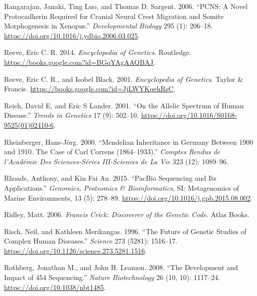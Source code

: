 \documentclass[
]{book}
\newlength{\cslhangindent}
\newlength{\cslentryspacingunit} %
\newenvironment{CSLReferences}[2] %
 {%
  \setlength{\parindent}{0pt}
  \ifodd #1
  \let\oldpar\par
  \def\par{\hangindent=\cslhangindent\oldpar}
  \fi
  \setlength{\parskip}{#2\cslentryspacingunit}
 }%
 {}
\begin{document}
\begin{CSLReferences}{1}{0}
\leavevmode{}%
Rangarajan, Janaki, Ting Luo, and Thomas D. Sargent. 2006. {``{PCNS}: {A} Novel Protocadherin Required for Cranial Neural Crest Migration and Somite Morphogenesis in {Xenopus}.''} \emph{Developmental Biology} 295 (1): 206--18. \url{https://doi.org/10.1016/j.ydbio.2006.03.025}.

\leavevmode{}%
Reeve, Eric C. R. 2014. \emph{Encyclopedia of {Genetics}}. {Routledge}. \url{https://books.google.com?id=BGqYAgAAQBAJ}.

\leavevmode{}%
Reeve, Eric C. R., and Isobel Black. 2001. \emph{Encyclopedia of {Genetics}}. {Taylor \& Francis}. \url{https://books.google.com?id=JjLWYKqehRsC}.

\leavevmode{}%
Reich, David E, and Eric S Lander. 2001. {``On the Allelic Spectrum of Human Disease.''} \emph{Trends in Genetics} 17 (9): 502--10. \url{https://doi.org/10.1016/S0168-9525(01)02410-6}.

\leavevmode{}%
Rheinberger, Hans-Jörg. 2000. {``Mendelian Inheritance in {Germany} Between 1900 and 1910. {The} Case of {Carl Correns} (1864--1933).''} \emph{Comptes Rendus de l'Académie Des Sciences-Séries III-Sciences de La Vie} 323 (12): 1089--96.

\leavevmode{}%
Rhoads, Anthony, and Kin Fai Au. 2015. {``{PacBio Sequencing} and {Its Applications}.''} \emph{Genomics, Proteomics \& Bioinformatics}, {SI}: {Metagenomics} of {Marine Environments}, 13 (5): 278--89. \url{https://doi.org/10.1016/j.gpb.2015.08.002}.

\leavevmode{}%
Ridley, Matt. 2006. \emph{Francis {Crick}: Discoverer of the Genetic Code}. {Atlas Books}.

\leavevmode{}%
Risch, Neil, and Kathleen Merikangas. 1996. {``The {Future} of {Genetic Studies} of {Complex Human Diseases}.''} \emph{Science} 273 (5281): 1516--17. \url{https://doi.org/10.1126/science.273.5281.1516}.

\leavevmode{}%
Rothberg, Jonathan M., and John H. Leamon. 2008. {``The Development and Impact of 454 Sequencing.''} \emph{Nature Biotechnology} 26 (10, 10): 1117--24. \url{https://doi.org/10.1038/nbt1485}.


\end{CSLReferences}
\end{document}
